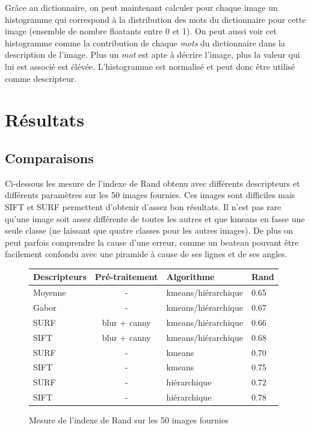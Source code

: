 \documentclass[12pt,a4paper,utf8x]{report}
\begin{document}
        Grâce au dictionnaire, on peut maintenant calculer pour chaque image un histogramme qui correspond à la distribution des mots du dictionnaire pour cette image (ensemble de nombre floatants entre 0 et 1). On peut aussi voir cet histogramme comme la contribution de chaque \textit{mots} du dictionnaire dans la description de l'image. Plus un \textit{mot} est apte à décrire l'image, plus la valeur qui lui est associé est élévée. L'histogramme est normalisé et peut donc être utilisé comme descripteur.


\chapter{Résultats}

\section{Comparaisons}
  Ci-dessous les mesure de l'indexe de Rand obtenu avec différents descripteurs et différents paramètres sur les 50 images fournies. Ces images sont difficiles mais SIFT et SURF permettent d'obtenir d'assez bon résultats. Il n'est pas rare qu'une image soit assez différente de toutes les autres et que kmeans en fasse une seule classe (ne laissant que quatre classes pour les autres images). De plus on peut parfois comprendre la cause d'une erreur, comme un beateau pouvant être facilement confondu avec une piramide à cause de ses lignes et de ses angles.

  \begin{figure}[!h]
      \centering
        \begin{tabular}{ | l | c | l | l |}
          \hline
          Descripteurs & Pré-traitement & Algorithme & Rand \\
          \hline
            Moyenne & -             & kmeans/hiérarchique   & 0.65\\
            Gabor   & -             & kmeans/hiérarchique   & 0.67\\
            SURF    & blur + canny  & kmeans/hiérarchique   & 0.66\\
            SIFT    & blur + canny  & kmeans/hiérarchique   & 0.68\\
            SURF    & -             & kmeans                & 0.70\\
            SIFT    & -             & kmeans                & 0.75\\
            SURF    & -             & hiérarchique          & 0.72\\
            SIFT    & -             & hiérarchique          & 0.78\\
          \hline  
        \end{tabular}
    \caption{Mesure de l'indexe de Rand sur les 50 images fournies}
  \end{figure}
\end{document}
